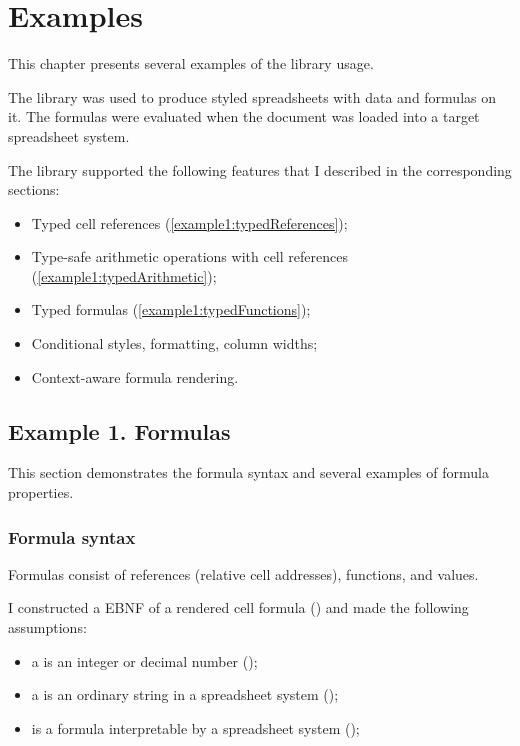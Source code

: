 \chapter{Examples}
\label{chap:impl}

This chapter presents several examples of the \clerk library usage.

The library was used to produce styled spreadsheets with data and formulas on it. The formulas were evaluated when the document was loaded into a target spreadsheet system.

The library supported the following features that I described in the corresponding sections:

\begin{itemize}
  \item Typed cell references (\cref{example1:typedReferences});
  \item Type-safe arithmetic operations with cell references (\cref{example1:typedArithmetic});
  \item Typed formulas (\cref{example1:typedFunctions});
  \item Conditional styles, formatting, column widths;
  \item Context-aware formula rendering.
\end{itemize}

\section{Example 1. Formulas}
\label{sec:ex1}

This section demonstrates the formula syntax and several examples of formula properties.

\subsection{Formula syntax}

Formulas consist of references (relative cell addresses), functions, and values.

I constructed a EBNF of a rendered cell formula () and made the following assumptions:

\begin{itemize}
  \item a  is an integer or decimal number ();
  \item a  is an ordinary string in a spreadsheet system ();
  \item {} is a formula interpretable by a spreadsheet system ();
\end{itemize}


